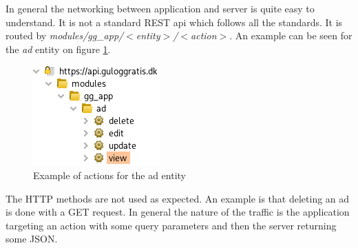 In general the networking between application and server is quite easy to understand. It is not a standard REST api which follows all the standards. It is routed by \textit{modules/gg\_app/$<$entity$>$/$<$action$>$}. An example can be seen for the \textit{ad} entity on figure \ref{fig:ad-actions}. 

\begin{figure}[htbp]
    \centering
    \includegraphics[width=0.5\columnwidth]{../dynamic-analysis/pictures/ad-actions.png}
    \caption{Example of actions for the ad entity}
    \label{fig:ad-actions}
\end{figure}

The HTTP methods are not used as expected. An example is that deleting an ad is done with a GET request. In general the nature of the traffic is the application targeting an action with some query parameters and then the server returning some JSON.    